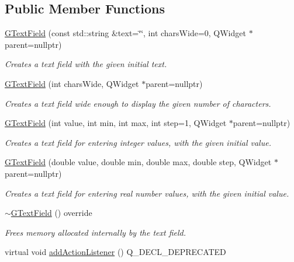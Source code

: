 \subsection*{Public Member Functions}
\begin{DoxyCompactItemize}
\item 
\mbox{\hyperlink{classsgl_1_1GTextField_aab905bd4d32eef20c4b8ed701a8ec97f}{G\+Text\+Field}} (const std\+::string \&text=\char`\"{}\char`\"{}, int chars\+Wide=0, Q\+Widget $\ast$parent=nullptr)
\begin{DoxyCompactList}\small\item\em Creates a text field with the given initial text. \end{DoxyCompactList}\item 
\mbox{\hyperlink{classsgl_1_1GTextField_a036419be062e4f447008a78dae22921c}{G\+Text\+Field}} (int chars\+Wide, Q\+Widget $\ast$parent=nullptr)
\begin{DoxyCompactList}\small\item\em Creates a text field wide enough to display the given number of characters. \end{DoxyCompactList}\item 
\mbox{\hyperlink{classsgl_1_1GTextField_a4caf2f90e21e32abf032c99a8c3f8efb}{G\+Text\+Field}} (int value, int min, int max, int step=1, Q\+Widget $\ast$parent=nullptr)
\begin{DoxyCompactList}\small\item\em Creates a text field for entering integer values, with the given initial value. \end{DoxyCompactList}\item 
\mbox{\hyperlink{classsgl_1_1GTextField_a8d164bf18d4dd4da6d5af0d23ee3a2c8}{G\+Text\+Field}} (double value, double min, double max, double step, Q\+Widget $\ast$parent=nullptr)
\begin{DoxyCompactList}\small\item\em Creates a text field for entering real number values, with the given initial value. \end{DoxyCompactList}\item 
\mbox{\hyperlink{classsgl_1_1GTextField_a3361f8538c9bd9337a7ccc533d3534c0}{$\sim$\+G\+Text\+Field}} () override
\begin{DoxyCompactList}\small\item\em Frees memory allocated internally by the text field. \end{DoxyCompactList}\item 
virtual void \mbox{\hyperlink{classsgl_1_1GInteractor_a02f20ea6edfa0671f31c4c648a253833}{add\+Action\+Listener}} () Q\+\_\+\+D\+E\+C\+L\+\_\+\+D\+E\+P\+R\+E\+C\+A\+T\+ED

\end{DoxyCompactItemize}
